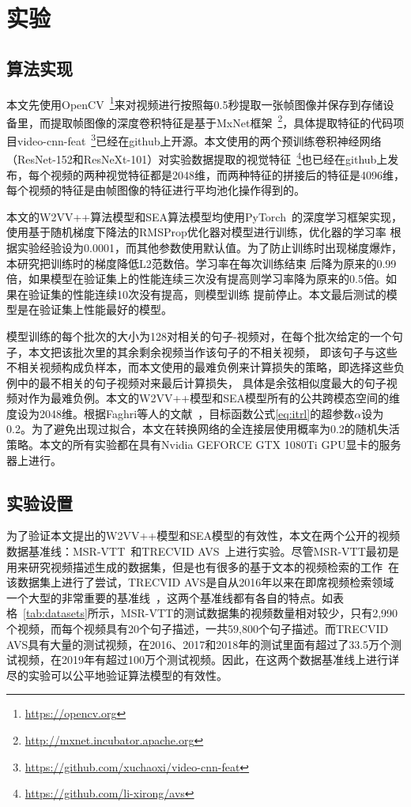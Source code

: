 \chapter{实验}
\section{算法实现}
本文先使用OpenCV~\footnote{\url{https://opencv.org}}来对视频进行按照每0.5秒提取一张帧图像并保存到存储设备里，而提取帧图像的深度卷积特征是基于MxNet框架~\footnote{\url{http://mxnet.incubator.apache.org}}，具体提取特征的代码项目video-cnn-feat~\footnote{\url{https://github.com/xuchaoxi/video-cnn-feat}}已经在github上开源。本文使用的两个预训练卷积神经网络（ResNet-152和ResNeXt-101）对实验数据提取的视觉特征~\footnote{\url{https://github.com/li-xirong/avs}}也已经在github上发布，每个视频的两种视觉特征都是2048维，而两种特征的拼接后的特征是4096维，每个视频的特征是由帧图像的特征进行平均池化操作得到的。

本文的W2VV++算法模型和SEA算法模型均使用PyTorch~\cite{pytorch}的深度学习框架实现，使用基于随机梯度下降法的RMSProp优化器对模型进行训练，优化器的学习率
根据实验经验设为0.0001，而其他参数使用默认值。为了防止训练时出现梯度爆炸，本研究把训练时的梯度降低L2范数倍。学习率在每次训练结束
后降为原来的0.99倍，如果模型在验证集上的性能连续三次没有提高则学习率降为原来的0.5倍。如果在验证集的性能连续10次没有提高，则模型训练
提前停止。本文最后测试的模型是在验证集上性能最好的模型。

模型训练的每个批次的大小为128对相关的句子-视频对，在每个批次给定的一个句子，本文把该批次里的其余剩余视频当作该句子的不相关视频，
即该句子与这些不相关视频构成负样本，而本文使用的最难负例来计算损失的策略，即选择这些负例中的最不相关的句子视频对来最后计算损失，
具体是余弦相似度最大的句子视频对作为最难负例。本文的W2VV++模型和SEA模型所有的公共跨模态空间的维度设为2048维。根据Faghri等人的文献~\cite{faghri2017vse++}，目标函数公式\ref{eq:itrl}的超参数$\alpha$设为0.2。为了避免出现过拟合，本文在转换网络的全连接层使用概率为0.2的随机失活策略。本文的所有实验都在具有Nvidia GEFORCE GTX 1080Ti GPU显卡的服务器上进行。

\section{实验设置}
为了验证本文提出的W2VV++模型和SEA模型的有效性，本文在两个公开的视频数据基准线：MSR-VTT~\cite{msrvtt}和TRECVID AVS~\cite{awad2016trecvid}上进行实验。尽管MSR-VTT最初是用来研究视频描述生成的数据集，但是也有很多的基于文本的视频检索的工作~\cite{mithun2018learning,miech2019howto100m,dong2019dual,liu2019use,yu2018a}在该数据集上进行了尝试，TRECVID AVS是自从2016年以来在即席视频检索领域一个大型的非常重要的基准线~\cite{awad2016trecvid,awad2017trecvid,awad2018trecvid,awad2019trecvid}，这两个基准线都有各自的特点。如表格~\ref{tab:datasets}所示，MSR-VTT的测试数据集的视频数量相对较少，只有2,990个视频，而每个视频具有20个句子描述，一共59,800个句子描述。而TRECVID AVS具有大量的测试视频，在2016、2017和2018年的测试里面有超过了33.5万个测试视频，在2019年有超过100万个测试视频。因此，在这两个数据基准线上进行详尽的实验可以公平地验证算法模型的有效性。

